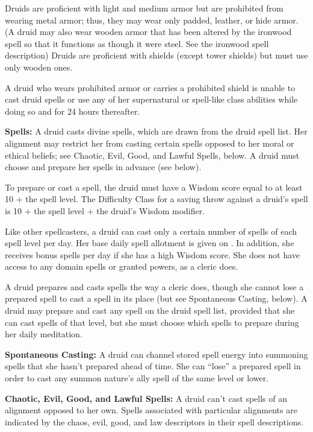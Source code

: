 Druids are proficient with light and medium armor but are prohibited from wearing metal armor; thus, they may wear only padded, leather, or hide armor. (A druid may also wear wooden armor that has been altered by the ironwood spell so that it functions as though it were steel. See the ironwood spell description) Druids are proficient with shields (except tower shields) but must use only wooden ones.

A druid who wears prohibited armor or carries a prohibited shield is unable to cast druid spells or use any of her supernatural or spell-like class abilities while doing so and for 24 hours thereafter.

\textbf{Spells:} A druid casts divine spells, which are drawn from the druid spell list. Her alignment may restrict her from casting certain spells opposed to her moral or ethical beliefs; see Chaotic, Evil, Good, and Lawful Spells, below. A druid must choose and prepare her spells in advance (see below).

To prepare or cast a spell, the druid must have a Wisdom score equal to at least 10 + the spell level. The Difficulty Class for a saving throw against a druid's spell is 10 + the spell level + the druid's Wisdom modifier.

Like other spellcasters, a druid can cast only a certain number of spells of each spell level per day. Her base daily spell allotment is given on . In addition, she receives bonus spells per day if she has a high Wisdom score. She does not have access to any domain spells or granted powers, as a cleric does.

A druid prepares and casts spells the way a cleric does, though she cannot lose a prepared spell to cast a  spell in its place (but see Spontaneous Casting, below). A druid may prepare and cast any spell on the druid spell list, provided that she can cast spells of  that level, but she must choose which spells to prepare during her daily meditation.


\textbf{Spontaneous Casting:} A druid can channel stored spell energy into summoning spells that she hasn't prepared ahead of time. She can ``lose'' a prepared spell in order to cast any summon nature's ally spell of the same level or lower.

\textbf{Chaotic, Evil, Good, and Lawful Spells:} A druid can't cast spells of an alignment opposed to her own. Spells associated with particular alignments are indicated by the chaos, evil, good, and law descriptors in their spell descriptions.

